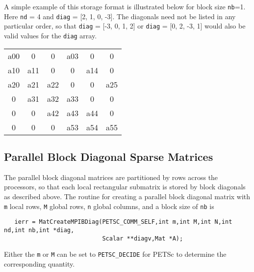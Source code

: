 \documentclass[twoside,12pt]{../sty/report_petsc}
\begin{document}
A simple example of this storage format is illustrated below for block
size {\tt nb}=1. 
Here {\tt nd} = 4 and {\tt diag} = [2, 1, 0, -3]. The
diagonals need not be listed in any particular order, so that
{\tt diag} = [-3, 0, 1, 2] or {\tt diag} = [0, 2, -3, 1] would also
be valid values for the {\tt diag} array. 

\begin{center}
\begin{tabular}{| c c c c c c |}
\hline
a00  &0    &0    &a03  &0    &0\\
a10  &a11  &0    &0    &a14  &0\\
a20  &a21  &a22  &0    &0    &a25\\
0    &a31  &a32  &a33  &0    &0\\
0    &0    &a42  &a43  &a44  &0\\
0    &0    &0    &a53  &a54  &a55\\
\hline
\end{tabular}
\end{center}

\subsection{Parallel Block Diagonal Sparse Matrices}

The parallel block diagonal matrices are partitioned by rows across
the processors, so that each local rectangular submatrix is stored by
block diagonals as described above.  The routine for creating a
parallel block diagonal matrix with {\tt m} local rows, {\tt M} global
rows, {\tt n} global columns, and a block size of {\tt nb} is
\begin{verbatim}
   ierr = MatCreateMPIBDiag(PETSC_COMM_SELF,int m,int M,int N,int nd,int nb,int *diag,
                            Scalar **diagv,Mat *A);
\end{verbatim}
Either the {\tt m} or {\tt M} can be set to {\tt PETSC\_DECIDE} for PETSc
to determine the corresponding quantity.




\end{document}
